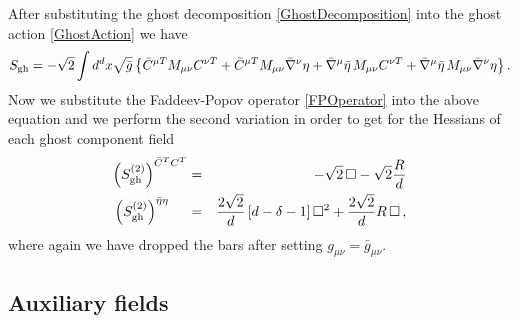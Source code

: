 \documentclass[notitlepage,eqsecnum,bm,amsmath,preprintnumbers,superscriptaddress,nofootinbib,aps,11pt]{revtex4-1}
\begin{document}
After substituting the ghost decomposition \eqref{GhostDecomposition} into the ghost action \eqref{GhostAction} we have 
\begin{equation}
S_{\rm gh}=-\sqrt{2}\int d^dx\sqrt{\bar g}\left\{\bar C^{\mu T}M_{\mu\nu}C^{\nu T} +\bar C^{\mu T}M_{\mu\nu}\bar \nabla^{\nu}\eta+\bar \nabla^{\mu}\bar\eta \,M_{\mu\nu} C^{\nu T} +\bar \nabla^{\mu}\bar\eta \, M_{\mu\nu}\bar \nabla^{\nu}\eta\right\}.
\end{equation}
Now we substitute the Faddeev-Popov operator \eqref{FPOperator} into the above equation and we perform the second variation in order to get for the Hessians of each ghost component field
\begin{eqnarray} \label{bare_gh_hessians}
\left(S^{(2)}_{\rm gh}\right)^{\bar C^T C^T }&=&-\sqrt{2}\,\Box-\sqrt{2}\frac{R}{d}\\
  \label{bare_gh_hessians_eta} \left(S^{(2)}_{\rm gh}\right)^{\bar \eta\eta }\,\,\,\,\,\,\,\,&=&\frac{2\sqrt{2}}{d}\left[d-\delta-1\right]\Box^2+\frac{2\sqrt{2}}{d}R\,\Box\,,
\end{eqnarray}
where again we have dropped the bars after setting $g_{\mu\nu}=\bar g_{\mu\nu}$.

\subsection{Auxiliary fields}
\label{subsec:AuxiliaryFields}
\end{document}
